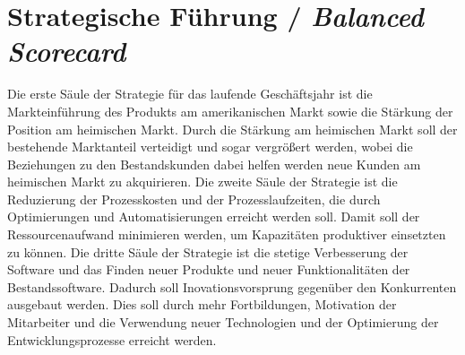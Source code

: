 \section{Strategische Führung / \emph{Balanced Scorecard}}
\label{sec:balanced}
Die erste Säule der Strategie für das laufende Geschäftsjahr ist die Markteinführung des Produkts am amerikanischen Markt sowie die Stärkung der Position am heimischen Markt. Durch die Stärkung am heimischen Markt soll der bestehende Marktanteil verteidigt und sogar vergrößert werden, wobei die Beziehungen zu den Bestandskunden dabei helfen werden neue Kunden am heimischen Markt zu akquirieren.
\newline
\newline
Die zweite Säule der Strategie ist die Reduzierung der Prozesskosten und der Prozesslaufzeiten, die durch Optimierungen und Automatisierungen erreicht werden soll. Damit soll der Ressourcenaufwand minimieren werden, um Kapazitäten produktiver einsetzten zu können.
\newline
\newline
Die dritte Säule der Strategie ist die stetige Verbesserung der Software und das Finden neuer Produkte und neuer Funktionalitäten der Bestandssoftware. Dadurch soll Inovationsvorsprung gegenüber den Konkurrenten ausgebaut werden. Dies soll durch mehr Fortbildungen, Motivation der Mitarbeiter und die Verwendung neuer Technologien und der Optimierung der Entwicklungsprozesse erreicht werden.

